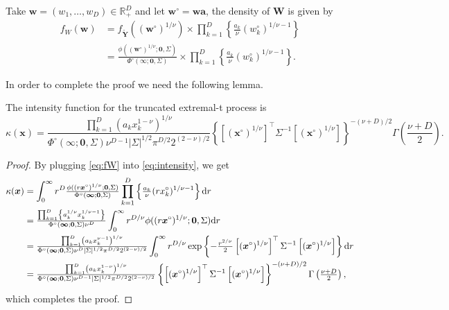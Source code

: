 \documentclass[12pt]{article}
\begin{document}
Take $\bm w = (w_1, \ldots, w_D) \in \mathbb{R}^D_+$ and let $\bm w^\circ = \bm w \bm a$, the density of $\bm W$ is given by
%
\begin{align}
\label{eq:fW}
f_W(\bm w) &= f_{\tilde{\bm Y}} \left( \left( \bm w^\circ \right)^{1/\nu} \right) \times \prod_{k=1}^D \left\{ \frac{a_k}{\nu} \left(w_k^\circ \right)^{1/\nu-1} \right\} \nonumber \\
&= \frac{\phi\left( \left( \bm w^\circ \right)^{1/\nu} ;\bm 0, \Sigma \right)} {\Phi^\circ(\bm \infty;\bm 0, \Sigma)} 
\times \prod_{k=1}^D \left\{ \frac{a_k}{\nu} \left(w_k^\circ\right)^{1/\nu-1} \right\}.
\end{align}
%

In order to complete the proof we need the following lemma.

\begin{lemma}
\label{lem:kappEt}
The intensity function for the truncated extremal-t process is
%
\begin{equation*}
\kappa(\bm x) = \frac{\prod_{k=1}^D \left(a_k x_k^{1-\nu}\right)^{1/\nu}}{\Phi^\circ(\bm \infty;\bm 0, \Sigma) \nu^{D-1}|\Sigma|^{1/2}\pi^{D/2}2^{(2-\nu)/2}} \left\{\left[(\bm x^\circ)^{1/\nu}\right]^\top \Sigma^{-1}\left[(\bm x^\circ)^{1/\nu}\right]\right\}^{-(\nu+D)/2} \Gamma\left(\frac{\nu+D}{2}\right).
\end{equation*}
\end{lemma}

\begin{proof}

By plugging \eqref{eq:fW} into \eqref{eq:intensity}, we get 
%
\begin{align*}
\kappa(\bm x) &= \int_0^\infty r^D {\textstyle{\phi( (r \bm x^\circ)^{1/\nu};\bm 0, \Sigma)\over\Phi^\circ(\bm \infty;\bm 0, \Sigma)}} \prod_{k=1}^D \left\{ {\textstyle{a_k\over\nu}} (r x_k^\circ)^{1/\nu-1}\right\}\text d r	\\
&= {\textstyle{\prod_{k=1}^D \left\{a_k^{1/\nu} x_k^{1/\nu-1}\right\}\over\Phi^\circ(\bm \infty;\bm 0, \Sigma)\nu^D}}\int_0^\infty r^{D/\nu} \phi( (r\bm x^\circ)^{1/\nu};\bm 0, \Sigma) \text d r\\
&= {\textstyle{\prod_{k=1}^D \left(a_k x_k^{\nu-1}\right)^{1/\nu}\over\Phi^\circ(\bm \infty;\bm 0, \Sigma) \nu^D |\Sigma|^{1/2} \pi^{D/2}2^{(2-\nu)/2}}} \int_0^\infty r^{D/\nu} \exp \left\{-{\textstyle{r^{2/\nu}\over2}} \left[(\bm x^\circ)^{1/\nu}\right]^\top\Sigma^{-1}\left[(\bm x^\circ)^{1/\nu}\right]\right\} \text dr\\
&= {\textstyle{\prod_{k=1}^D \left(a_k x_k^{1-\nu}\right)^{1/\nu}\over\Phi^\circ(\bm \infty;\bm 0, \Sigma) \nu^{D-1}|\Sigma|^{1/2}\pi^{D/2}2^{(2-\nu)/2}}} \left\{\left[(\bm x^\circ)^{1/\nu}\right]^\top \Sigma^{-1}\left[(\bm x^\circ)^{1/\nu}\right]\right\}^{-(\nu+D)/2} \Gamma\left({\textstyle{\nu+D\over2}}\right),
\label{eq:truncated_extremal_t_intensity}
\end{align*}
%
which completes the proof.
%
\end{proof}
\end{document}
